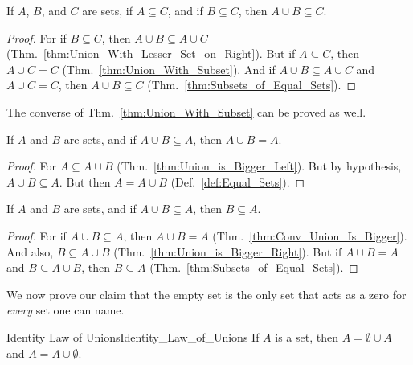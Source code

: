         \begin{theorem}
            \label{thm:Union_of_Subsets_is_Still_Subset}%
            If $A$, $B$, and $C$ are sets, if $A\subseteq{C}$, and if
            $B\subseteq{C}$, then $A\cup{B}\subseteq{C}$.
        \end{theorem}
        \begin{proof}
            For if $B\subseteq{C}$, then $A\cup{B}\subseteq{A}\cup{C}$
            (Thm.~\ref{thm:Union_With_Lesser_Set_on_Right}). But if
            $A\subseteq{C}$, then $A\cup{C}={C}$
            (Thm.~\ref{thm:Union_With_Subset}). And if
            $A\cup{B}\subseteq{A}\cup{C}$ and $A\cup{C}=C$, then
            $A\cup{B}\subseteq{C}$ (Thm.~\ref{thm:Subsets_of_Equal_Sets}).
        \end{proof}
        The converse of Thm.~\ref{thm:Union_With_Subset} can be proved as well.
        \begin{theorem}
            \label{thm:Conv_Union_Is_Bigger}%
            If $A$ and $B$ are sets, and if $A\cup{B}\subseteq{A}$, then
            $A\cup{B}=A$.
        \end{theorem}
        \begin{proof}
            For $A\subseteq{A}\cup{B}$ (Thm.~\ref{thm:Union_is_Bigger_Left}).
            But by hypothesis, $A\cup{B}\subseteq{A}$. But then $A=A\cup{B}$
            (Def.~\ref{def:Equal_Sets}).
        \end{proof}
        \begin{theorem}
            \label{thm:Union_is_Equal}%
            If $A$ and $B$ are sets, and if $A\cup{B}\subseteq{A}$, then
            $B\subseteq{A}$.
        \end{theorem}
        \begin{proof}
            For if $A\cup{B}\subseteq{A}$, then $A\cup{B}=A$
            (Thm.~\ref{thm:Conv_Union_Is_Bigger}). And also,
            $B\subseteq{A}\cup{B}$ (Thm.~\ref{thm:Union_is_Bigger_Right}). But
            if $A\cup{B}=A$ and $B\subseteq{A}\cup{B}$, then $B\subseteq{A}$
            (Thm.~\ref{thm:Subsets_of_Equal_Sets}).
        \end{proof}
        We now prove our claim that the empty set is the only set that acts as a
        zero for \textit{every} set one can name.
        \begin{ltheorem}{Identity Law of Unions}{Identity_Law_of_Unions}
            If $A$ is a set, then $A=\emptyset\cup{A}$ and $A=A\cup\emptyset$.
        \end{ltheorem}
